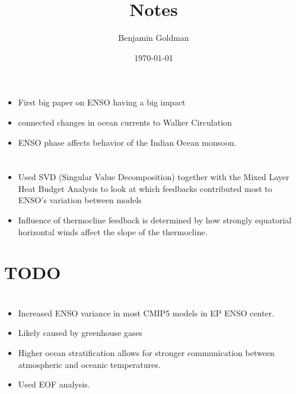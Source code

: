 \documentclass[11pt]{article}
\author{Benjamin Goldman}
\date{\today}
\title{Notes}
\begin{document}
\maketitle
\tableofcontents



\section{\cite{bjerknes1969atmospheric}}
\label{sec:org2ba3d44}

\begin{itemize}
\item First big paper on ENSO having a big impact
\item connected changes in ocean currents to Walker Circulation
\item ENSO phase affects behavior of the Indian Ocean monsoon.
\end{itemize}

\section{\cite{an2017feedback}}
\label{sec:org301fc0b}

\begin{itemize}
\item Used SVD (Singular Value Decomposition) together with the Mixed Layer Heat Budget Analysis to look at which feedbacks contributed most to ENSO's variation between models
\item Influence of thermocline feedback is determined by how strongly equatorial horizontal winds affect the slope of the thermocline.
\end{itemize}

\section{{\bfseries\sffamily TODO} \cite{boer2000transient}}
\label{sec:org0861beb}

\section{\cite{cai2018increased}}
\label{sec:org4e917df}

\begin{itemize}
\item Increased ENSO variance in most CMIP5 models in EP ENSO center.
\item Likely caused by greenhouse gases
\item Higher ocean stratification allows for stronger communication between atmospheric and oceanic temperatures.
\item Used EOF analysis.
\end{itemize}
\end{document}
